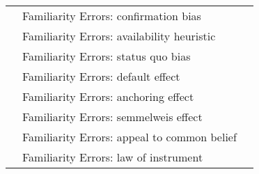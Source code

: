 \begin{table*}[]
\begin{tabular}{c|p{6cm}p{10cm}}
& \rowcolor{Gray} Familiarity Errors: confirmation bias &  \\
& \rowcolor{Gray} Familiarity Errors: availability heuristic &  \\
& \rowcolor{Gray} Familiarity Errors: status quo bias &  \\
& \rowcolor{Gray} Familiarity Errors: default effect &  \\
& \rowcolor{Gray} Familiarity Errors: anchoring effect &  \\
& \rowcolor{Gray} Familiarity Errors: semmelweis effect &  \\
& \rowcolor{Gray} Familiarity Errors: appeal to common belief &  \\
& \rowcolor{Gray} Familiarity Errors: law of instrument &  \\
\end{tabular}
\end{table*}
